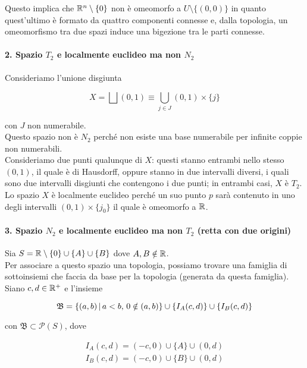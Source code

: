 Questo implica che $ \mathbb{R}^{n} \setminus \{0\} $ non è omeomorfo a $ U \setminus \{(0,0)\} $ in quanto quest'ultimo è formato da quattro componenti connesse e, dalla topologia, un omeomorfismo tra due spazi induce una bigezione tra le parti connesse.

\paragraph{2. Spazio $ T_{2} $ e localmente euclideo ma non $ N_{2} $}

Consideriamo l'unione disgiunta

\begin{equation}
	X = \bigsqcup (0,1) \equiv \bigcup_{j \in J} (0,1) \times \{j\}
\end{equation}

con $ J $ non numerabile.\\
Questo spazio non è $ N_{2} $ perché non esiste una base numerabile per infinite coppie non numerabili.\\
Consideriamo due punti qualunque di $ X $: questi stanno entrambi nello stesso $ (0,1) $, il quale è di Hausdorff, oppure stanno in due intervalli diversi, i quali sono due intervalli disgiunti che contengono i due punti; in entrambi casi, $ X $ è $ T_{2} $.\\
Lo spazio $ X $ è localmente euclideo perché un suo punto $ p $ sarà contenuto in uno degli intervalli $ (0,1) \times \{j_{0}\} $ il quale è omeomorfo a $ \mathbb{R} $.

\paragraph{3. Spazio $ N_{2} $ e localmente euclideo ma non $ T_{2} $ (retta con due origini)}

Sia $ S = \mathbb{R} \setminus \{0\} \cup \{A\} \cup \{B\} $ dove $ A,B \notin \mathbb{R} $.\\ 
Per associare a questo spazio una topologia, possiamo trovare una famiglia di sottoinsiemi che faccia da base per la topologia (generata da questa famiglia). Siano $ c,d \in \mathbb{R}^{+} $ e l'insieme

\begin{equation}
	\mathfrak{B} = \left\{ (a,b) \, \middle| \, a<b, \, 0 \notin (a,b) \right\} \cup \left\{ I_{A}(c,d) \right\} \cup \left\{ I_{B}(c,d) \right\}
\end{equation}

con $ \mathfrak{B} \subset \mathcal{P} (S) $, dove

\begin{gather}
	I_{A}(c,d) = (-c,0) \cup \{A\} \cup (0,d)\\
	I_{B}(c,d) = (-c,0) \cup \{B\} \cup (0,d)
\end{gather}

